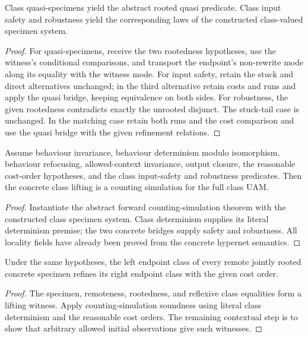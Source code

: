 
\begin{lemma}
Class quasi-specimens yield the abstract rooted quasi predicate. Class input
safety and robustness yield the corresponding laws of the constructed
class-valued specimen system.
\end{lemma}
\begin{proof}
For quasi-specimens, receive the two rootedness hypotheses, use the witness's
conditional comparisons, and transport the endpoint's non-rewrite mode along
its equality with the witness mode. For input safety, retain the stuck and
direct alternatives unchanged; in the third alternative retain costs and runs
and apply the quasi bridge, keeping equivalence on both sides. For robustness,
the given rootedness contradicts exactly the unrooted disjunct. The stuck-tail
case is unchanged. In the matching case retain both runs and the cost comparison
and use the quasi bridge with the given refinement relations.
\end{proof}




\begin{theorem}
Assume behaviour invariance, behaviour determinism modulo isomorphism,
behaviour refocusing, allowed-context invariance, output closure, the reasonable
cost-order hypotheses, and the class input-safety and robustness predicates.
Then the concrete class lifting is a counting simulation for the full class UAM.
\end{theorem}
\begin{proof}
Instantiate the abstract forward counting-simulation theorem with the constructed
class specimen system. Class determinism supplies its literal determinism
premise; the two concrete bridges supply safety and robustness. All locality
fields have already been proved from the concrete hypernet semantics.
\end{proof}
\begin{corollary}
Under the same hypotheses, the left endpoint class of every remote jointly
rooted concrete specimen refines its right endpoint class with the given
cost order.
\end{corollary}
\begin{proof}
The specimen, remoteness, rootedness, and reflexive class equalities form a
lifting witness. Apply counting-simulation soundness using literal class
determinism and the reasonable cost orders. The remaining contextual step is
to show that arbitrary allowed initial observations give such witnesses.
\end{proof}

